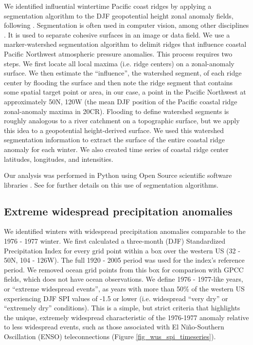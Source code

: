\documentclass[final, double]{ua-thesis}
\begin{document}
We identified influential wintertime Pacific coast ridges by applying a segmentation algorithm to the DJF geopotential height zonal anomaly fields, following \citet{3malevich_importance_2017}. Segmentation is often used in computer vision, among other disciplines \citep[e.g., ][]{3digabel_iterative_1978, 3vincent_watersheds_1991, 3cousty_watershed_2009}. It is used to separate cohesive surfaces in an image or data field. We use a marker-watershed segmentation algorithm to delimit ridges that influence coastal Pacific Northwest atmospheric pressure anomalies. This process requires two steps. We first locate all local maxima (i.e. ridge centers) on a zonal-anomaly surface. We then estimate the ``influence'', the watershed segment, of each ridge center by flooding the surface and then note the ridge segment that contains some spatial target point or area, in our case, a point in the Pacific Northwest at approximately 50\textdegree N, 120\textdegree W (the mean DJF position of the Pacific coastal ridge zonal-anomaly maxima in 20CR). Flooding to define watershed segments is roughly analogous to a river catchment on a topographic surface, but we apply this idea to a geopotential height-derived surface. We used this watershed segmentation information to extract the surface of the entire coastal ridge anomaly for each winter. We also created time series of coastal ridge center latitudes, longitudes, and intensities.

Our analysis was performed in Python using Open Source scientific software libraries \citep{3hunter_matplotlib_2007, 3van_der_walt_numpy_2011, 3dawson_eofs_2016}. See \citet{3malevich_importance_2017} for further details on this use of segmentation algorithms.

\subsection{Extreme widespread precipitation anomalies}

We identified winters with widespread precipitation anomalies comparable to the 1976 - 1977 winter. We first calculated a three-month (DJF) Standardized Precipitation Index \citep[SPI,][]{3mckee_relationship_1993} for every grid point within a box over the western US (32 - 50\textdegree N, 104 - 126\textdegree W). The full 1920 - 2005 period was used for the index's reference period. We removed ocean grid points from this box for comparison with GPCC fields, which does not have ocean observations. We define 1976 - 1977-like years, or ``extreme widespread events'', as years with more than 50\% of the western US experiencing DJF SPI values of -1.5 or lower (i.e. widespread ``very dry'' or ``extremely dry'' conditions). This is a simple, but strict criteria that highlights the unique, extremely widespread characteristic of the 1976-1977 anomaly relative to less widespread events, such as those associated with El Ni\~{n}o-Southern Oscillation (ENSO) teleconnections (Figure \ref{fig_wus_spi_timeseries}).
\end{document}
